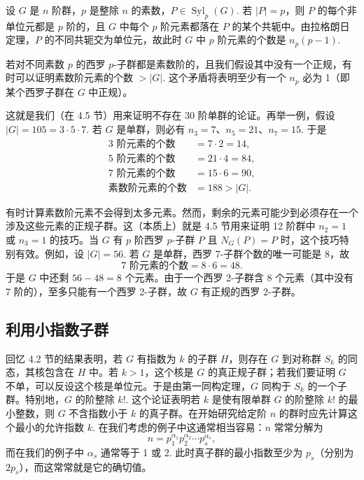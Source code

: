 设 \(G\) 是 \(n\) 阶群，\(p\) 是整除 \(n\) 的素数，\(P \in \operatorname{Syl}_p(G)\). 若 \(|P| = p\)，则 \(P\) 的每个非单位元都是 \(p\) 阶的，且 \(G\) 中每个 \(p\) 阶元素都落在 \(P\) 的某个共轭中。由拉格朗日定理，\(P\) 的不同共轭交为单位元，故此时 \(G\) 中 \(p\) 阶元素的个数是 \(n_p(p-1)\).

若对不同素数 \(p\) 的西罗 \(p\)-子群都是素数阶的，且我们假设其中没有一个正规，有时可以证明素数阶元素的个数 \(> |G|\). 这个矛盾将表明至少有一个 \(n_p\) 必为 1（即某个西罗子群在 \(G\) 中正规）。

这就是我们（在 4.5 节）用来证明不存在 30 阶单群的论证。再举一例，假设 \(|G| = 105 = 3 \cdot 5 \cdot 7\). 若 \(G\) 是单群，则必有 \(n_3 = 7\)、\(n_5 = 21\)、\(n_7 = 15\). 于是
\[
\begin{aligned}
\text{3 阶元素的个数} &= 7 \cdot 2 = 14, \\
\text{5 阶元素的个数} &= 21 \cdot 4 = 84, \\
\text{7 阶元素的个数} &= 15 \cdot 6 = 90, \\
\text{素数阶元素的个数} &= 188 > |G|.
\end{aligned}
\]

有时计算素数阶元素不会得到太多元素。然而，剩余的元素可能少到必须存在一个涉及这些元素的正规子群。这（本质上）就是 4.5 节用来证明 12 阶群中 \(n_2 = 1\) 或 \(n_3 = 1\) 的技巧。当 \(G\) 有 \(p\) 阶西罗 \(p\)-子群 \(P\) 且 \(N_G(P) = P\) 时，这个技巧特别有效。例如，设 \(|G| = 56\). 若 \(G\) 是单群，西罗 7-子群个数的唯一可能是 8，故
\[
\text{7 阶元素的个数} = 8 \cdot 6 = 48.
\]
于是 \(G\) 中还剩 \(56 - 48 = 8\) 个元素。由于一个西罗 2-子群含 8 个元素（其中没有 7 阶的），至多只能有一个西罗 2-子群，故 \(G\) 有正规的西罗 2-子群。

\subsection*{利用小指数子群}

回忆 4.2 节的结果表明，若 \(G\) 有指数为 \(k\) 的子群 \(H\)，则存在 \(G\) 到对称群 \(S_k\) 的同态，其核包含在 \(H\) 中。若 \(k > 1\)，这个核是 \(G\) 的真正规子群；若我们要证明 \(G\) 不单，可以反设这个核是单位元。于是由第一同构定理，\(G\) 同构于 \(S_k\) 的一个子群。特别地，\(G\) 的阶整除 \(k!\). 这个论证表明若 \(k\) 是使有限单群 \(G\) 的阶整除 \(k!\) 的最小整数，则 \(G\) 不含指数小于 \(k\) 的真子群。在开始研究给定阶 \(n\) 的群时应先计算这个最小的允许指数 \(k\). 在我们考虑的例子中这通常相当容易：\(n\) 常常分解为
\[
n = p_1^{\alpha_1} p_2^{\alpha_2} \cdots p_s^{\alpha_s},
\]
而在我们的例子中 \(\alpha_s\) 通常等于 1 或 2. 此时真子群的最小指数至少为 \(p_s\)（分别为 \(2p_s\)），而这常常就是它的确切值。

